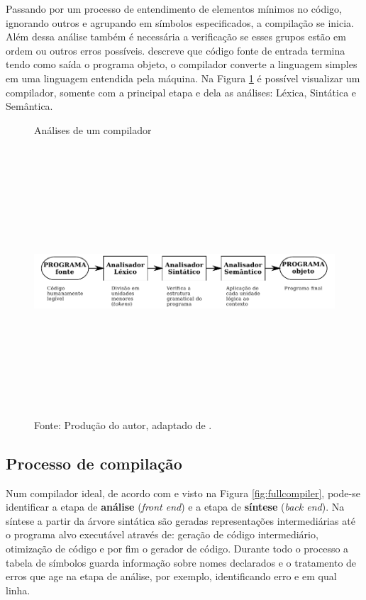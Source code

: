 Passando por um processo de entendimento de elementos mínimos no código, ignorando outros e agrupando em símbolos especificados, a compilação se inicia. Além dessa análise também é necessária a verificação se esses grupos estão em ordem ou outros erros possíveis.  descreve que código fonte de entrada termina tendo como saída o programa objeto, o compilador converte a linguagem simples em uma linguagem entendida pela máquina. Na Figura \ref{fig:compilador} é possível visualizar um compilador, somente com a principal etapa e dela as análises: Léxica, Sintática e Semântica.

\begin{figure}[h]
  \caption{Análises de um compilador}\label{fig:compilador}
  \centering
\includegraphics[width=.98\textwidth,height=10cm,keepaspectratio]{figures/etapas-compilador.pdf}
  \caption*{\footnotesize Fonte: Produção do autor, adaptado de .}
\end{figure}

\subsection{Processo de compilação}

Num compilador ideal, de acordo com  e visto na Figura \ref{fig:fullcompiler}, pode-se identificar a etapa de \textbf{análise} (\textit{front end}) e a etapa de \textbf{síntese} (\textit{back end}). Na síntese a partir da árvore sintática são geradas representações intermediárias até o programa alvo executável através de: geração de código intermediário, otimização de código e por fim o gerador de código. Durante todo o processo a tabela de símbolos guarda informação sobre nomes declarados e o tratamento de erros que age na etapa de análise, por exemplo, identificando erro e em qual linha.

